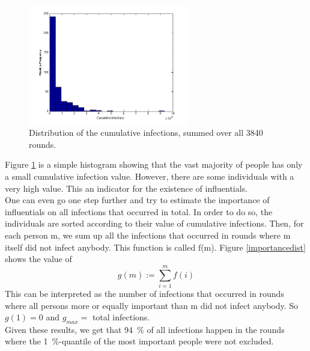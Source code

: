 \begin{figure}
\begin{center}
\includegraphics[width=7cm]{influ2}
\caption{Distribution of the cumulative infections, summed over all 3840 rounds. \newline}
\label{Histo}
\end{center}
\end{figure}
Figure \ref{Histo} is a simple histogram showing that the vast majority of people has only a small cumulative infection value. However, there are some individuals with a very high value. This an indicator for the existence of influentials. \\





\noindent One can even go one step further and try to estimate the importance of influentials on all infections that occurred in total. In order to do so, the individuals are sorted according to their value of cumulative infections. Then, for each person m, we sum up all the infections that occurred in rounds where m itself did not infect anybody. This function is called f(m). Figure \ref{importancedist} shows the value of $$g(m):=\sum_{i=1}^m f(i) $$
This can be interpreted as the number of infections that occurred in rounds where all persons more or equally important than m did not infect anybody. So $g(1)=0$ and $g_{max}=$ total infections.
\\
Given these results, we get that 94~\% of all infections happen in the rounds where the 1~\%-quantile of the most important people were not excluded. 

